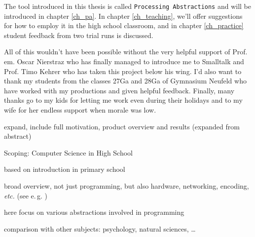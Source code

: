 The tool introduced in this thesis is called \texttt{Processing Abstractions} and will be introduced in chapter \ref{ch_pa}. In chapter \ref{ch_teaching}, we'll offer suggestions for how to employ it in the high school classroom, and in chapter \ref{ch_practice} student feedback from two trial runs is discussed.

All of this wouldn't have been possible without the very helpful support of Prof.\,em. Oscar Nierstraz who has finally managed to introduce me to Smalltalk and Prof. Timo Kehrer who has taken this project below his wing. I'd also want to thank my students from the classes 27Ga and 28Ga of Gymnasium Neufeld who have worked with my productions and given helpful feedback. Finally, many thanks go to my kids for letting me work even during their holidays and to my wife for her endless support when morale was low.

\begin{todo}
\item expand, include full motivation, product overview and results (expanded from abstract)
\item Scoping: Computer Science in High School
\item based on introduction in primary school
\item broad overview, not just programming, but also hardware, networking, encoding, \emph{etc.} (see e.\,g. \cite{Erz16})
\item here focus on various abstractions involved in programming
\item comparison with other subjects: psychology, natural sciences, \dots
\end{todo}
